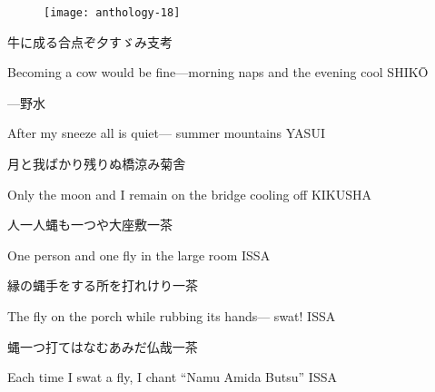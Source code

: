 \begin{figure}
    \texttt{[image: anthology-18]}
\end{figure}

\begin{haiku}
    {\FH 牛に成る合点ぞ夕すゞみ}\hfill{\FH 支考}

    \vin{} Becoming a cow
    \vin{} \vin{} would be fine---morning naps
    \vin{} \vin{} \vin{} and the evening cool \hspace{\fill} SHIK\={O}
\end{haiku}

\begin{haiku}
    {---}\hfill{\FH 野水}

    \vin{} After my sneeze
    \vin{} \vin{} all is quiet---
    \vin{} \vin{} \vin{} summer mountains \hspace{\fill} YASUI
\end{haiku}

\begin{haiku}
    {\FH 月と我ばかり残りぬ橋涼み}\hfill{\FH 菊舎}

    \vin{} Only the moon and I
    \vin{} \vin{} remain on the bridge
    \vin{} \vin{} \vin{} cooling off \hspace{\fill} KIKUSHA
\end{haiku}

\begin{haiku}
    {\FH 人一人蝿も一つや大座敷}\hfill{\FH 一茶}

    \vin{} One person
    \vin{} \vin{} and one fly
    \vin{} \vin{} \vin{} in the large room \hspace{\fill} ISSA
\end{haiku}

\begin{haiku}
    {\FH 縁の蝿手をする所を打れけり}\hfill{\FH 一茶}

    \vin{} The fly on the porch
    \vin{} \vin{} while rubbing its hands---
    \vin{} \vin{} \vin{} swat! \hspace{\fill} ISSA
\end{haiku}

\begin{haiku}
    {\FH 蝿一つ打てはなむあみだ仏哉}\hfill{\FH 一茶}

    \vin{} Each time
    \vin{} \vin{} I swat a fly, I chant
    \vin{} \vin{} \vin{} ``Namu Amida Butsu'' \hspace{\fill} ISSA
\end{haiku}

